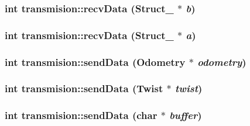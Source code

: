 \label{classtransmision_a81218832d0a18422027503d1b529ac3c}
\hypertarget{classtransmision_a905e696047472384fdd47c962be55e72}{
\subsubsection[{recvData}]{\setlength{\rightskip}{0pt plus 5cm}int transmision::recvData ({\bf Struct\_} $\ast$ {\em b})}}
\label{classtransmision_a905e696047472384fdd47c962be55e72}
\hypertarget{classtransmision_a1dbf734bad68289da9ec9bf0b28000f7}{
\subsubsection[{recvData}]{\setlength{\rightskip}{0pt plus 5cm}int transmision::recvData ({\bf Struct\_} $\ast$ {\em a})}}
\label{classtransmision_a1dbf734bad68289da9ec9bf0b28000f7}
\hypertarget{classtransmision_a383ce5304c45dc09b7c994b9708dc6b2}{
\subsubsection[{sendData}]{\setlength{\rightskip}{0pt plus 5cm}int transmision::sendData ({\bf Odometry} $\ast$ {\em odometry})}}
\label{classtransmision_a383ce5304c45dc09b7c994b9708dc6b2}
\hypertarget{classtransmision_a23c12d04eab4a7bd583a3b376c4c8fd3}{
\subsubsection[{sendData}]{\setlength{\rightskip}{0pt plus 5cm}int transmision::sendData ({\bf Twist} $\ast$ {\em twist})}}
\label{classtransmision_a23c12d04eab4a7bd583a3b376c4c8fd3}
\hypertarget{classtransmision_af76f07480f2cb76eedc2d3db45bd3aa0}{
\subsubsection[{sendData}]{\setlength{\rightskip}{0pt plus 5cm}int transmision::sendData (char $\ast$ {\em buffer})}}
\label{classtransmision_af76f07480f2cb76eedc2d3db45bd3aa0}
